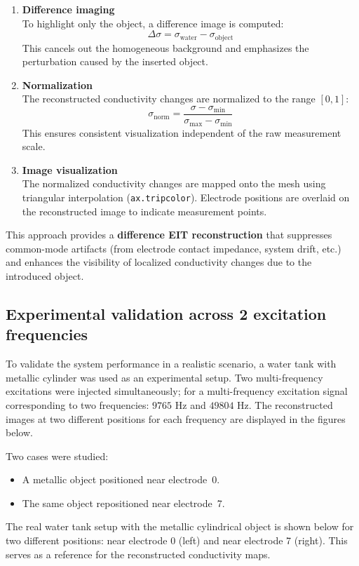 \begin{enumerate}
    \item \textbf{Difference imaging} \\
    To highlight only the object, a difference image is computed:
    \[
        \Delta \sigma = \sigma_{\text{water}} - \sigma_{\text{object}}
    \]
    This cancels out the homogeneous background and emphasizes the perturbation caused by the inserted object.

    \item \textbf{Normalization} \\
    The reconstructed conductivity changes are normalized to the range $[0, 1]$:
    \[
        \sigma_{\text{norm}} = \frac{\sigma - \sigma_{\min}}{\sigma_{\max} - \sigma_{\min}}
    \]
    This ensures consistent visualization independent of the raw measurement scale.

    \item \textbf{Image visualization} \\
    The normalized conductivity changes are mapped onto the mesh using triangular interpolation (\texttt{ax.tripcolor}). Electrode positions are overlaid on the reconstructed image to indicate measurement points.
\end{enumerate}

This approach provides a \textbf{difference EIT reconstruction} that suppresses common-mode artifacts (from electrode contact impedance, system drift, etc.) and enhances the visibility of localized conductivity changes due to the introduced object.

\subsection{Experimental validation across 2 excitation frequencies}

To validate the system performance in a realistic scenario, a water tank with metallic cylinder was used as an experimental setup. Two multi-frequency excitations were injected simultaneously; for a multi-frequency excitation signal corresponding to two frequencies: $9765$ Hz and $49804$ Hz. The reconstructed images at two different positions for each frequency are displayed in the figures below.

Two cases were studied:
\begin{itemize}
    \item A metallic object positioned near electrode~0.
    \item The same object repositioned near electrode~7.
\end{itemize}
The real water tank setup with the metallic cylindrical object is shown below for two different positions: near electrode 0 (left) and near electrode 7 (right). This serves as a reference for the reconstructed conductivity maps.


